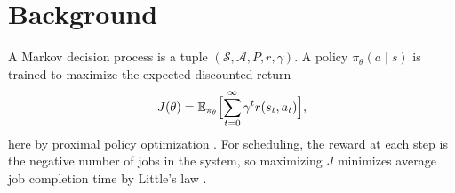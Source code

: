 \chapter{Background}
\label{ch:background}

A Markov decision process is a tuple $(\mathcal{S}, \mathcal{A}, P, r, \gamma)$. A policy
$\pi_\theta(a \mid s)$ is trained to maximize the expected discounted return
\begin{equation}
  J(\theta) = \mathbb{E}_{\pi_\theta}\Bigl[\sum_{t=0}^{\infty} \gamma^{t} r(s_t, a_t)\Bigr],
  \label{eq:return}
\end{equation}
here by proximal policy optimization \citep{schulman2017}. For scheduling, the reward at each
step is the negative number of jobs in the system, so maximizing $J$ minimizes average job
completion time by Little's law \citep{sutton2018}.
